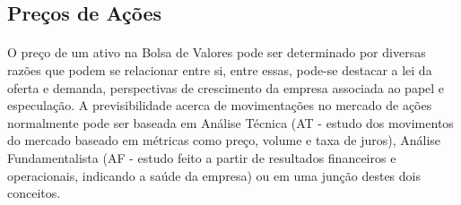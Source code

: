 \documentclass[grad,numbers]{coppe}
\begin{document}
  	\subsection{Preços de Ações}
  		\paragraph{}O preço de um ativo na Bolsa de Valores pode ser determinado por diversas razões que podem se relacionar entre si, entre essas, pode-se destacar a lei da oferta e demanda, perspectivas de crescimento da empresa associada ao papel e especulação. A previsibilidade acerca de movimentações no mercado de ações normalmente pode ser baseada em Análise Técnica (AT - estudo dos movimentos do mercado baseado em métricas como preço, volume e taxa de juros\cite{analise-tecnica}), Análise Fundamentalista (AF - estudo feito a partir de resultados financeiros e operacionais, indicando a saúde da empresa\cite{analise-fundamentalista}) ou em uma junção destes dois conceitos.
\end{document}
